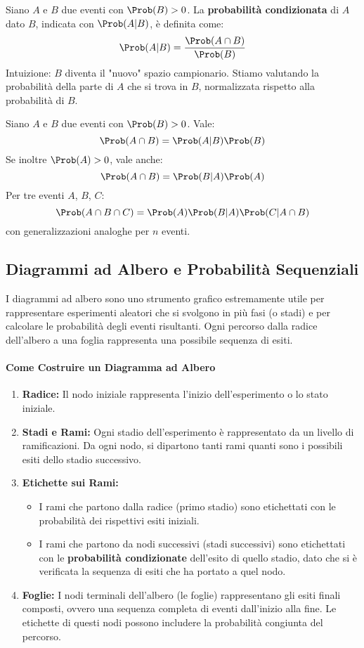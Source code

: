 \begin{definition}
Siano $A$ e $B$ due eventi con $\Prob(B) > 0$. La \textbf{probabilità condizionata} di $A$ dato $B$, indicata con $\Prob(A|B)$, è definita come:
\[ \Prob(A|B) = \frac{\Prob(A \cap B)}{\Prob(B)} \]
Intuizione: $B$ diventa il "nuovo" spazio campionario. Stiamo valutando la probabilità della parte di $A$ che si trova in $B$, normalizzata rispetto alla probabilità di $B$.
\end{definition}

\begin{corollary}\label{cor:catena}
Siano $A$ e $B$ due eventi con $\Prob(B) > 0$. Vale:
\[ \Prob(A \cap B) = \Prob(A|B) \Prob(B) \]
Se inoltre $\Prob(A) > 0$, vale anche:
\[ \Prob(A \cap B) = \Prob(B|A) \Prob(A) \]
Per tre eventi $A$, $B$, $C$:
\[ \Prob(A \cap B \cap C) = \Prob(A) \Prob(B|A) \Prob(C|A \cap B) \]
con generalizzazioni analoghe per $n$ eventi.
\end{corollary}

\subsection{Diagrammi ad Albero e Probabilità Sequenziali}
\label{subsec:diagrammi_albero}

I diagrammi ad albero sono uno strumento grafico estremamente utile per rappresentare esperimenti aleatori che si svolgono in più fasi (o stadi) e per calcolare le probabilità degli eventi risultanti. Ogni percorso dalla radice dell'albero a una foglia rappresenta una possibile sequenza di esiti.

\paragraph{Come Costruire un Diagramma ad Albero}
\begin{enumerate}
    \item \textbf{Radice:} Il nodo iniziale rappresenta l'inizio dell'esperimento o lo stato iniziale.
    \item \textbf{Stadi e Rami:} Ogni stadio dell'esperimento è rappresentato da un livello di ramificazioni. Da ogni nodo, si dipartono tanti rami quanti sono i possibili esiti dello stadio successivo.
    \item \textbf{Etichette sui Rami:}
    \begin{itemize}
        \item I rami che partono dalla radice (primo stadio) sono etichettati con le probabilità dei rispettivi esiti iniziali.
        \item I rami che partono da nodi successivi (stadi successivi) sono etichettati con le \textbf{probabilità condizionate} dell'esito di quello stadio, dato che si è verificata la sequenza di esiti che ha portato a quel nodo.
    \end{itemize}
    \item \textbf{Foglie:} I nodi terminali dell'albero (le foglie) rappresentano gli esiti finali composti, ovvero una sequenza completa di eventi dall'inizio alla fine. Le etichette di questi nodi possono includere la probabilità congiunta del percorso.
\end{enumerate}

